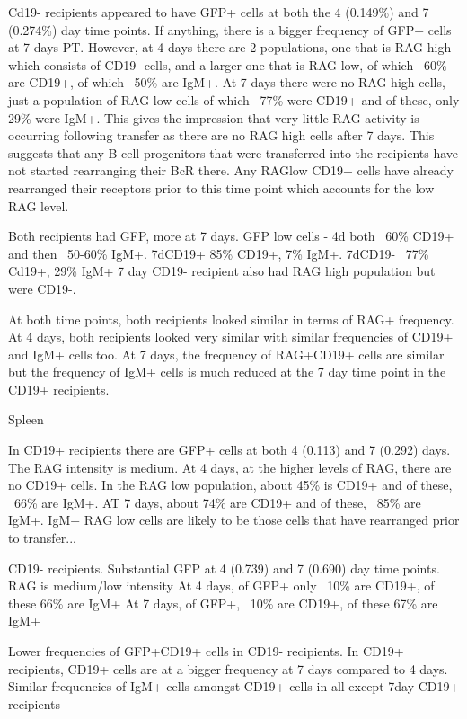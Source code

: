 Cd19- recipients appeared to have GFP+ cells at both the 4 (0.149\%) and 7 (0.274\%) day time points. If anything, there is a bigger frequency of GFP+ cells at 7 days PT.
However, at 4 days there are 2 populations, one that is RAG high which consists of CD19- cells, and a larger one that is RAG low, of which ~60\% are CD19+, of which ~50\% are IgM+.
At 7 days there were no RAG high cells, just a population of RAG low cells of which ~77\% were CD19+ and of these, only 29\% were IgM+.
This gives the impression that very little RAG activity is occurring following transfer as there are no RAG high cells after 7 days.
This suggests that any B cell progenitors that were transferred into the recipients have not started rearranging their BcR there.
Any RAGlow CD19+ cells have already rearranged their receptors prior to this time point which accounts for the low RAG level.

Both recipients had GFP, more at 7 days.
GFP low cells - 4d both ~60\% CD19+ and then ~50-60\% IgM+. 
		 		7dCD19+ 85\% CD19+, 7\% IgM+.
		 		7dCD19- ~77\% Cd19+, 29\% IgM+
		 		7 day CD19- recipient also had RAG high population but were CD19-.
		 		
At both time points, both recipients looked similar in terms of RAG+ frequency. 
At 4 days, both recipients looked very similar with similar frequencies of CD19+ and IgM+ cells too. 
At 7 days, the frequency of RAG+CD19+ cells are similar but the frequency of IgM+ cells is much reduced at the 7 day time point in the CD19+ recipients.


Spleen

In CD19+ recipients there are GFP+ cells at both 4 (0.113) and 7 (0.292) days. The RAG intensity is medium. 
At 4 days, at the higher levels of RAG, there are no CD19+ cells.
In the RAG low population, about 45\% is CD19+ and of these, ~66\% are IgM+.
AT 7 days, about 74\% are CD19+ and of these, ~85\% are IgM+.
IgM+ RAG low cells are likely to be those cells that have rearranged prior to transfer...

CD19- recipients. 
Substantial GFP at 4 (0.739) and 7 (0.690) day time points. 
RAG is medium/low intensity
At 4 days, of GFP+ only ~10\% are CD19+, of these 66\% are IgM+
At 7 days, of GFP+, ~10\% are CD19+, of these 67\% are IgM+

Lower frequencies of GFP+CD19+ cells in CD19- recipients.
In CD19+ recipients, CD19+ cells are at a bigger frequency at 7 days compared to 4 days.
Similar frequencies of IgM+ cells amongst CD19+ cells in all except 7day CD19+ recipients


